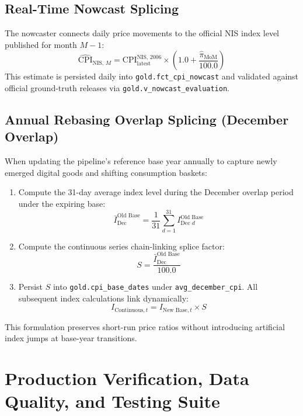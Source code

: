 \documentclass[11pt,a4paper]{article}
\begin{document}
\subsection{Real-Time Nowcast Splicing}
The nowcaster connects daily price movements to the official NIS index level published for month $M-1$:
\begin{equation}
\widehat{\text{CPI}}_{\text{NIS, } M} = \text{CPI}_{\text{latest}}^{\text{NIS, 2006}} \times \left( 1.0 + \frac{\hat{\pi}_{\text{MoM}}}{100.0} \right)
\end{equation}
This estimate is persisted daily into \texttt{gold.fct\_cpi\_nowcast} and validated against official ground-truth releases via \texttt{gold.v\_nowcast\_evaluation}.

\subsection{Annual Rebasing Overlap Splicing (December Overlap)}
When updating the pipeline's reference base year annually to capture newly emerged digital goods and shifting consumption baskets:
\begin{enumerate}
    \item Compute the 31-day average index level during the December overlap period under the expiring base:
    \begin{equation}
    \bar{I}_{\text{Dec}}^{\text{Old Base}} = \frac{1}{31} \sum_{d=1}^{31} I_{\text{Dec } d}^{\text{Old Base}}
    \end{equation}
    \item Compute the continuous series chain-linking splice factor:
    \begin{equation}
    S = \frac{\bar{I}_{\text{Dec}}^{\text{Old Base}}}{100.0}
    \end{equation}
    \item Persist $S$ into \texttt{gold.cpi\_base\_dates} under \texttt{avg\_december\_cpi}. All subsequent index calculations link dynamically:
    \begin{equation}
    I_{\text{Continuous}, t} = I_{\text{New Base}, t} \times S
    \end{equation}
\end{enumerate}
This formulation preserves short-run price ratios without introducing artificial index jumps at base-year transitions.

\newpage

\section{Production Verification, Data Quality, and Testing Suite}
\end{document}
